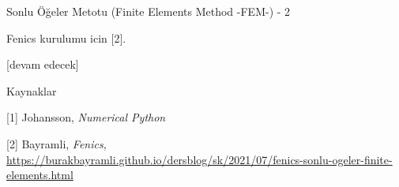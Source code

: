 \documentclass[12pt,fleqn]{article}\usepackage{../../common}
\begin{document}
Sonlu Öğeler Metotu (Finite Elements Method -FEM-) - 2

Fenics kurulumu icin [2].


[devam edecek]

Kaynaklar

[1] Johansson, {\em Numerical Python}

[2] Bayramli, {\em Fenics},
    \url{https://burakbayramli.github.io/dersblog/sk/2021/07/fenics-sonlu-ogeler-finite-elements.html}
\end{document}
